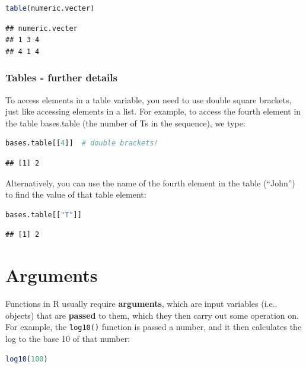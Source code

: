 \documentclass[
]{book}
\newcommand{\passthrough}[1]{#1}
\begin{document}
\begin{lstlisting}[language=R]
table(numeric.vecter)
\end{lstlisting}

\begin{lstlisting}
## numeric.vecter
## 1 3 4 
## 4 1 4
\end{lstlisting}

\hypertarget{tables---further-details}{%
\subsubsection{Tables - further details}\label{tables---further-details}}

To access elements in a table variable, you need to use double square brackets, just like accessing elements in a list. For example, to access the fourth element in the table bases.table (the number of Ts in the sequence), we type:

\begin{lstlisting}[language=R]
bases.table[[4]]  # double brackets!
\end{lstlisting}

\begin{lstlisting}
## [1] 2
\end{lstlisting}

Alternatively, you can use the name of the fourth element in the table (``John'') to find the value of that table element:

\begin{lstlisting}[language=R]
bases.table[["T"]]
\end{lstlisting}

\begin{lstlisting}
## [1] 2
\end{lstlisting}

\hypertarget{arguments}{%
\section{Arguments}\label{arguments}}

Functions in R usually require \textbf{arguments}, which are input variables (i.e.. objects) that are \textbf{passed} to them, which they then carry out some operation on. For example, the \passthrough{\lstinline!log10()!} function is passed a number, and it then calculates the log to the base 10 of that number:

\begin{lstlisting}[language=R]
log10(100)
\end{lstlisting}
\end{document}
